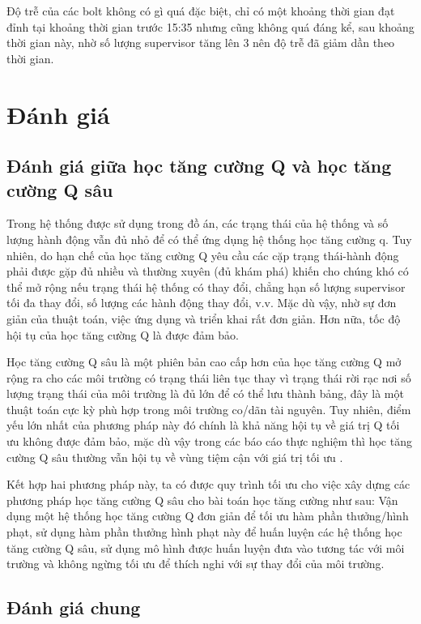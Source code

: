 Độ trễ của các bolt không có gì quá đặc biệt, chỉ có một khoảng thời gian đạt đỉnh tại khoảng thời gian trước 15:35 nhưng cũng không quá đáng kể, sau khoảng thời gian này, nhờ số lượng supervisor tăng lên 3 nên độ trễ đã giảm dần theo thời gian.

\section{Đánh giá}

\subsection{Đánh giá giữa học tăng cường Q và học tăng cường Q sâu}

Trong hệ thống được sử dụng trong đồ án, các trạng thái của hệ thống và số lượng hành động vẫn đủ nhỏ để có thể ứng dụng hệ thống học tăng cường q. Tuy nhiên, do hạn chế của học tăng cường Q yêu cầu các cặp trạng thái-hành động phải được gặp đủ nhiều và thường xuyên (đủ khám phá) khiến cho chúng khó có thể mở rộng nếu trạng thái hệ thống có thay đổi, chẳng hạn số lượng supervisor tối đa thay đổi, số lượng các hành động thay đổi, v.v. Mặc dù vậy, nhờ sự đơn giản của thuật toán, việc ứng dụng và triển khai rất đơn giản. Hơn nữa, tốc độ hội tụ của học tăng cường Q là được đảm bảo.

Học tăng cường Q sâu là một phiên bản cao cấp hơn của học tăng cường Q mở rộng ra cho các môi trường có trạng thái liên tục thay vì trạng thái rời rạc nơi số lượng trạng thái của môi trường là đủ lớn để có thể lưu thành bảng, đây là một thuật toán cực kỳ phù hợp trong môi trường co/dãn tài nguyên. Tuy nhiên, điểm yếu lớn nhất của phương pháp này đó chính là khả năng hội tụ về giá trị Q tối ưu không được đảm bảo, mặc dù vậy trong các báo cáo thực nghiệm thì học tăng cường Q sâu thường vẫn hội tụ về vùng tiệm cận với giá trị tối ưu \autocite{Zhang2023OnTC}.

Kết hợp hai phương pháp này, ta có được quy trình tối ưu cho việc xây dựng các phương pháp học tăng cường Q sâu cho bài toán học tăng cường như sau: Vận dụng một hệ thống học tăng cường Q đơn giản để tối ưu hàm phần thưởng/hình phạt, sử dụng hàm phần thưởng hình phạt này để huấn luyện các hệ thống học tăng cường Q sâu, sử dụng mô hình được huấn luyện đưa vào tương tác với môi trường và không ngừng tối ưu để thích nghi với sự thay đổi của môi trường.

\subsection{Đánh giá chung}

